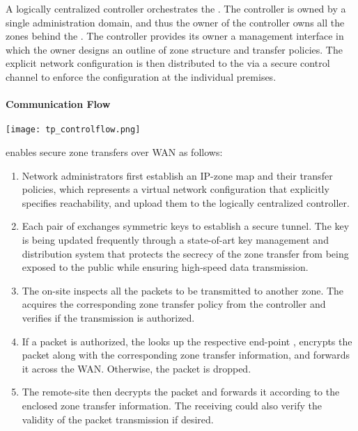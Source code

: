 A logically centralized controller orchestrates the \tps. The controller is owned 
by a single administration domain, and thus the owner of the controller owns all
the zones behind the \tps. The controller provides its owner a management interface
in which the owner designs an outline of zone structure and transfer policies. The
explicit network configuration is then distributed to the \tps via a secure control
channel to enforce the configuration at the individual premises.

\paragraph{Communication Flow}

    \begin{center}
        \texttt{[image: tp\_controlflow.png]}
        \label{archi:overview}
    \end{center}

\name enables secure zone transfers over WAN as follows:

\begin{enumerate}
	\item Network administrators first establish an IP-zone map and their transfer 
	policies, which represents a virtual network configuration that explicitly 
	specifies reachability, and upload them to the logically centralized 
	controller.
	\item Each pair of \tps exchanges symmetric keys to establish a secure tunnel. 
	The key is being updated frequently through a state-of-art key management and
	distribution system that protects the secrecy of the zone transfer from
	being exposed to the public while ensuring high-speed data transmission.
	\item The on-site \tp inspects all the packets to be transmitted to another zone.
	The \tp acquires the corresponding zone transfer policy from the controller
	and verifies if the transmission is authorized.
	\item If a packet is authorized, the \tp looks up the respective end-point \tp,
	encrypts the packet along with the corresponding zone transfer information,
	and forwards it across the WAN. Otherwise, the packet is dropped.
	\item The remote-site \tp then decrypts the packet and forwards it according to 
	the enclosed zone transfer information. The receiving \tp could also verify
	the validity of the packet transmission if desired.
\end{enumerate}


